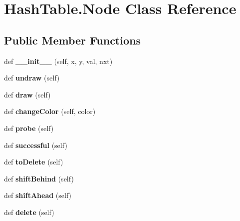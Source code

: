 \hypertarget{class_hash_table_1_1_node}{}\section{Hash\+Table.\+Node Class Reference}
\label{class_hash_table_1_1_node}
\subsection*{Public Member Functions}
\begin{DoxyCompactItemize}
\item 
\mbox{\label{class_hash_table_1_1_node_a7ff8b9136684e4b25aa1f3db517558c8}} 
def {\bfseries \+\_\+\+\_\+init\+\_\+\+\_\+} (self, x, y, val, nxt)
\item 
\mbox{\label{class_hash_table_1_1_node_a96f5ccb7ad28ecb75e074deca933caa0}} 
def {\bfseries undraw} (self)
\item 
\mbox{\label{class_hash_table_1_1_node_a1c3dea5412211e136a85961fb383f8f8}} 
def {\bfseries draw} (self)
\item 
\mbox{\label{class_hash_table_1_1_node_a9910292e3eb760e33b7e4d471b5868fe}} 
def {\bfseries change\+Color} (self, color)
\item 
\mbox{\label{class_hash_table_1_1_node_abc01ce8dac8b6a475ac5c24d8bac39b3}} 
def {\bfseries probe} (self)
\item 
\mbox{\label{class_hash_table_1_1_node_a93d0cde2243e732764d7c81f43e545e7}} 
def {\bfseries successful} (self)
\item 
\mbox{\label{class_hash_table_1_1_node_acfcf93acfcce1604cabbc277e153dcda}} 
def {\bfseries to\+Delete} (self)
\item 
\mbox{\label{class_hash_table_1_1_node_a4728273d77870ca7508fc286f9b70281}} 
def {\bfseries shift\+Behind} (self)
\item 
\mbox{\label{class_hash_table_1_1_node_aee7e9400a9c85d22d1d9ccb2fe7e904e}} 
def {\bfseries shift\+Ahead} (self)
\item 
\mbox{\label{class_hash_table_1_1_node_a27ce172402b61db8d9885799d40e03b9}} 
def {\bfseries delete} (self)
\end{DoxyCompactItemize}
